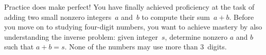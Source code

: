 






Practice does make perfect!
You have finally achieved proficiency at the task of adding two small nonzero integers~$a$ and~$b$ to compute their sum~$a+b$.
Before you move on to studying four-digit numbers,
you want to achieve mastery by also understanding the inverse problem: 
given integer~$s$, determine nonzero $a$ and $b$ such that $a+b=s$.
None of the numbers may use more than $3$~digits.


